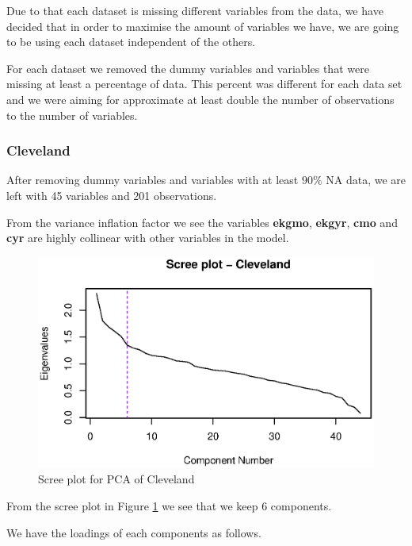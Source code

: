 \documentclass[a4paper]{article}
\begin{document}
Due to that each dataset is missing different variables from the data, we have decided that in order to maximise the amount of variables we have, we are going to be using each dataset independent of the others. 

For each dataset we removed the dummy variables and variables that were missing at least a percentage of data. This percent was different for each data set and we were aiming for approximate at least double the number of observations to the number of variables. 

\subsubsection{Cleveland}

After removing dummy variables and variables with at least $90\%$ NA data, we are left with 45 variables and 201 observations. 



From the variance inflation factor we see the variables \textbf{ekgmo}, \textbf{ekgyr}, \textbf{cmo} and \textbf{cyr} are highly collinear with other variables in the model.

\begin{figure}[H]
	\begin{center}
		\includegraphics[width=12cm]{question3output/clescreeplot.eps}
	\end{center}
	\caption{Scree plot for PCA of Cleveland}
	\label{q3-cle-screeplot}
\end{figure}

From the scree plot in Figure \ref{q3-cle-screeplot} we see that we keep 6 components.

We have the loadings of each components as follows.
\end{document}
